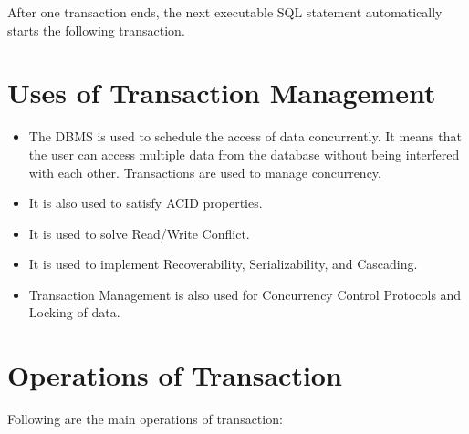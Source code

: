 \documentclass{article}
\begin{document}
After one transaction ends, the next executable SQL statement automatically starts the following transaction.



\section{Uses of Transaction Management} 

\begin{itemize}
\item The DBMS is used to schedule the access of data concurrently. It means that the user can access multiple data from the database without being interfered with each other. Transactions are used to manage concurrency.
\item It is also used to satisfy ACID properties.
\item It is used to solve Read/Write Conflict.
\item It is used to implement Recoverability, Serializability, and Cascading.
\item Transaction Management is also used for Concurrency Control Protocols and Locking of data.
\end{itemize}

\section{Operations of Transaction}

Following are the main operations of transaction:
\end{document}
